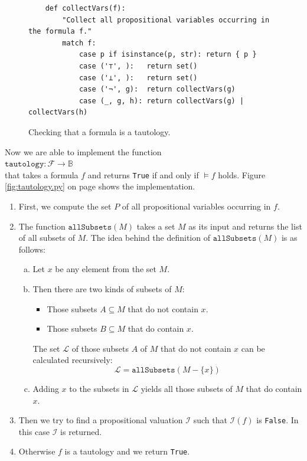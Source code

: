 \begin{figure}[!ht]
  \centering
\begin{verbatim}
    def collectVars(f):
        "Collect all propositional variables occurring in the formula f."
        match f:
            case p if isinstance(p, str): return { p }
            case ('⊤', ):   return set()
            case ('⊥', ):   return set()
            case ('¬', g):  return collectVars(g)
            case (_, g, h): return collectVars(g) | collectVars(h) 
\end{verbatim}
\vspace*{-0.3cm}
  \caption{Checking that a formula is a tautology.}
  \label{fig:tautology.py-collectVars}
\end{figure}

Now we are able to implement the function 
\\[0.2cm]
\hspace*{1.3cm}
$\mathtt{tautology}: \mathcal{F} \rightarrow \mathbb{B}$
\\[0.2cm]
that takes a formula $f$ and returns \texttt{True} if and only if $\models f$ holds.
Figure \ref{fig:tautology.py} on page \pageref{fig:tautology.py}
shows the implementation.
\begin{enumerate}
\item First, we compute the set $P$ of all propositional variables occurring in $f$.
\item The function $\mathtt{allSubsets}(M)$ takes a set $M$ as its input and returns the list of all subsets of $M$.
      The idea behind the definition of $\mathtt{allSubsets}(M)$ is as follows:
      \begin{enumerate}[(a)]
      \item Let $x$ be any element from the set $M$. 
      \item Then there are two kinds of subsets of $M$:
        \begin{itemize}
        \item Those subsets $A \subseteq M$ that do not contain $x$.
        \item Those subsets $B \subseteq M$ that do contain $x$.
      \end{itemize}
      The set $\mathcal{L}$ of those subsets $A$ of $M$ that do not contain $x$ can be calculated recursively:
      $$ \mathcal{L} = \texttt{allSubsets}(M - \{x\}) $$
      \item Adding $x$ to the subsets in $\mathcal{L}$ yields all those subsets of $M$ that do contain $x$. 
      \end{enumerate}  
\item Then we try to find a propositional valuation $\mathcal{I}$ such that $\mathcal{I}(f)$ is
      \texttt{False}.  In this case $\mathcal{I}$ is returned. 
\item Otherwise $f$ is a tautology and we return \texttt{True}.
\end{enumerate}

